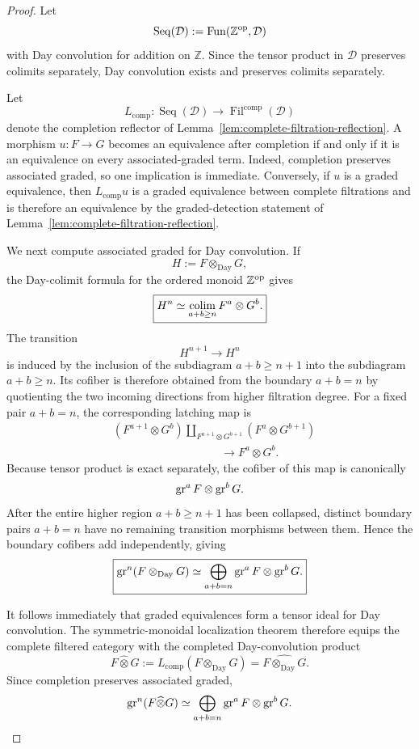 \begin{proof}
Let
\[
    \operatorname{Seq}(\mathcal D)
    :=
    \operatorname{Fun}(\mathbb Z^{\mathrm{op}},\mathcal D)
\]
with Day convolution for addition on \(\mathbb Z\).  Since the tensor product in
\(\mathcal D\) preserves colimits separately, Day convolution exists and
preserves colimits separately.

Let
\[
    L_{\mathrm{comp}}:
    \operatorname{Seq}(\mathcal D)
    \longrightarrow
    \operatorname{Fil}^{\mathrm{comp}}(\mathcal D)
\]
denote the completion reflector of
Lemma~\ref{lem:complete-filtration-reflection}.  A morphism \(u:F\to G\)
becomes an equivalence after completion if and only if it is an equivalence on
every associated-graded term.  Indeed, completion preserves associated
graded, so one implication is immediate.  Conversely, if \(u\) is a graded
equivalence, then \(L_{\mathrm{comp}}u\) is a graded equivalence between
complete filtrations and is therefore an equivalence by the graded-detection
statement of Lemma~\ref{lem:complete-filtration-reflection}.

We next compute associated graded for Day convolution.  If
\[
    H:=F\otimes_{\mathrm{Day}}G,
\]
the Day-colimit formula for the ordered monoid \(\mathbb Z^{\mathrm{op}}\) gives
\[
\boxed{
    H^n
    \simeq
    \operatorname*{colim}_{a+b\geq n}
    F^a\otimes G^b.
}
\]
The transition
\[
    H^{n+1}\longrightarrow H^n
\]
is induced by the inclusion of the subdiagram \(a+b\geq n+1\) into the
subdiagram \(a+b\geq n\).  Its cofiber is therefore obtained from the
boundary \(a+b=n\) by quotienting the two incoming directions from higher
filtration degree.  For a fixed pair \(a+b=n\), the corresponding latching
map is
\[
\begin{aligned}
    &
    \left(F^{a+1}\otimes G^b\right)
    \coprod_{F^{a+1}\otimes G^{b+1}}
    \left(F^a\otimes G^{b+1}\right)
    \\
    &\hspace{4cm}\longrightarrow
    F^a\otimes G^b.
\end{aligned}
\]
Because tensor product is exact separately, the cofiber of this map is
canonically
\[
    \operatorname{gr}^aF\otimes\operatorname{gr}^bG.
\]
After the entire higher region \(a+b\geq n+1\) has been collapsed, distinct
boundary pairs \(a+b=n\) have no remaining transition morphisms between them.
Hence the boundary cofibers add independently, giving
\[
\boxed{
    \operatorname{gr}^n(F\otimes_{\mathrm{Day}}G)
    \simeq
    \bigoplus_{a+b=n}
    \operatorname{gr}^aF\otimes\operatorname{gr}^bG.
}
\]

It follows immediately that graded equivalences form a tensor ideal for Day
convolution.  The symmetric-monoidal localization theorem therefore equips
the complete filtered category with the completed Day-convolution product
\[
    F\widehat\otimes G
    :=
    L_{\mathrm{comp}}
    \left(
        F\otimes_{\mathrm{Day}}G
    \right)
    =
    \widehat{F\otimes_{\mathrm{Day}}G}.
\]
Since completion preserves associated graded,
\[
    \operatorname{gr}^n(F\widehat\otimes G)
    \simeq
    \bigoplus_{a+b=n}
    \operatorname{gr}^aF\otimes\operatorname{gr}^bG.
\]


\end{proof}
